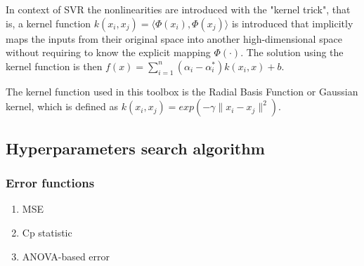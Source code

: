\documentclass{article}
\begin{document}
\begin{itemize}
In context of SVR the nonlinearities are introduced with the "kernel trick", that is, a kernel function $ k(x_i, x_j) = \langle \Phi(x_i), \Phi(x_j) \rangle $ is introduced that implicitly maps the inputs from their original space into another high-dimensional space without requiring to know the explicit mapping $ \Phi(\cdot) $. The solution using the kernel function is then $ f(x) = \sum_{i=1}^{n} (\alpha_i - \alpha^*_i)k(x_i, x) + b$. 

The kernel function used in this toolbox is the Radial Basis Function or Gaussian kernel, which is defined as $ k(x_i, x_j) = exp(-\gamma \|x_i - x_j\|^2)$.
\end{itemize}

\subsection{Hyperparameters search algorithm}

\subsubsection{Error functions}
\begin{enumerate}
	\item MSE
	\item Cp statistic
	\item ANOVA-based error
\end{enumerate}
\end{document}
